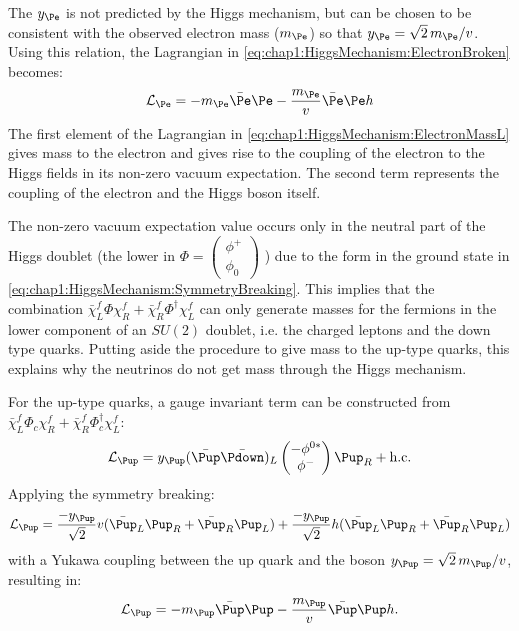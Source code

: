 The $y_{\Pe}$ is not predicted by the Higgs mechanism, but can be chosen to be consistent with the observed electron mass ($m_{\Pe}$) so that $y_{\Pe}=\sqrt{2}\,m_{\Pe}/v$. Using this relation, the Lagrangian in \ref{eq:chap1:HiggsMechanism:ElectronBroken} becomes:
\begin{equation}\label{eq:chap1:HiggsMechanism:ElectronMassL}
\mathcal{L}_{\Pe} = -m_{\Pe} \bar{\Pe}\Pe - \frac{m_{\Pe}}{v}\bar{\Pe}\Pe h
\end{equation}
The first element of the Lagrangian in \ref{eq:chap1:HiggsMechanism:ElectronMassL} gives mass to the electron and gives rise to the coupling of the electron to the Higgs fields in its non-zero vacuum expectation. 
The second term represents the coupling of the electron and the Higgs boson itself.

The non-zero vacuum expectation value occurs only in the neutral part of the Higgs doublet (the lower in $\Phi = \begin{pmatrix}  \phi^+ \\ \phi_0  \end{pmatrix} $ ) due to the form 
in the ground state in \ref{eq:chap1:HiggsMechanism:SymmetryBreaking}. This implies that the combination $\bar{\chi}_{L}^f \Phi \chi_{R}^{f} + \bar{\chi}_{R}^f \Phi^{\dagger} \chi_{L}^{f}$ can only generate
masses  for the fermions in the lower component of an $SU(2)$ doublet, i.e. the charged leptons and the down type quarks. Putting aside the procedure to give mass to the up-type quarks,
this explains why the neutrinos do not get mass through the Higgs mechanism.

For the up-type quarks, a gauge invariant term can be constructed from $\bar{\chi}_{L}^f \Phi_{c} \chi_{R}^{f} + \bar{\chi}_{R}^f \Phi_{c}^{\dagger} \chi_{L}^{f}$:
\begin{equation*}%
\mathcal{L}_{\Pup} = y_{\Pup} (\bar{\Pup} \bar{\Pdown})_{L}  \begin{pmatrix}  -\phi^{0*} \\ \phi^{-}  \end{pmatrix} \Pup_{R} + \textrm{h.c.}
\end{equation*}
Applying the symmetry breaking:
\begin{equation*}\label{eq:chap1:HiggsMechanism:UpTypeBroken}
\mathcal{L}_{\Pup} =  \frac{-y_{\Pup}}{\sqrt{2}} v (\bar{\Pup}_{L}\Pup_{R} + \bar{\Pup}_{R}\Pup_{L}) +  \frac{-y_{\Pup}}{\sqrt{2}} h (\bar{\Pup}_{L}\Pup_{R} + \bar{\Pup}_{R}\Pup_{L} )
\end{equation*}
with a Yukawa coupling between the up quark and the boson $y_{\Pup}=\sqrt{2}\,m_{\Pup}/v$, resulting in:
\begin{equation*}%
\mathcal{L}_{\Pup} = -m_{\Pup} \bar{\Pup}\Pup - \frac{m_{\Pup}}{v}\bar{\Pup}\Pup h .
\end{equation*}

